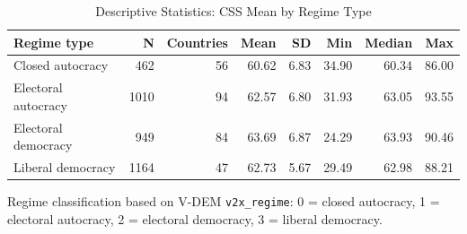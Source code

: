 \begin{table}[htbp]
\caption{\label{tab:desc_regime} Descriptive Statistics: CSS Mean by Regime Type}
\bigskip
\centering
\begin{tabular}{lrrrrrrr}
\toprule
Regime type & N & Countries & Mean & SD & Min & Median & Max \\
\midrule
Closed autocracy & 462 & 56 & 60.62 & 6.83 & 34.90 & 60.34 & 86.00 \\
Electoral autocracy & 1010 & 94 & 62.57 & 6.80 & 31.93 & 63.05 & 93.55 \\
Electoral democracy & 949 & 84 & 63.69 & 6.87 & 24.29 & 63.93 & 90.46 \\
Liberal democracy & 1164 & 47 & 62.73 & 5.67 & 29.49 & 62.98 & 88.21 \\
\bottomrule
\end{tabular}
\par \raggedright
Regime classification based on V-DEM \texttt{v2x\_regime}: 0 = closed autocracy, 1 = electoral autocracy, 2 = electoral democracy, 3 = liberal democracy.
\end{table}

